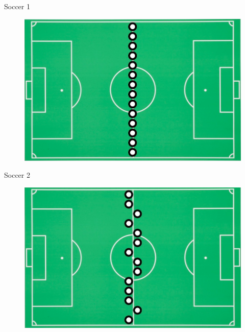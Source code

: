 \documentclass[handout]{beamer}
\begin{document}
\begin{frame}{Soccer 1}
 \begin{figure}[h!]
	\centering
	\includegraphics[scale=0.3]{pics/soccer1.png}
\end{figure}


\end{frame}


\begin{frame}{Soccer 2}
 \begin{figure}[h!]
	\centering
	\includegraphics[scale=0.3]{pics/soccer2.png}
\end{figure}


\end{frame}
\end{document}

